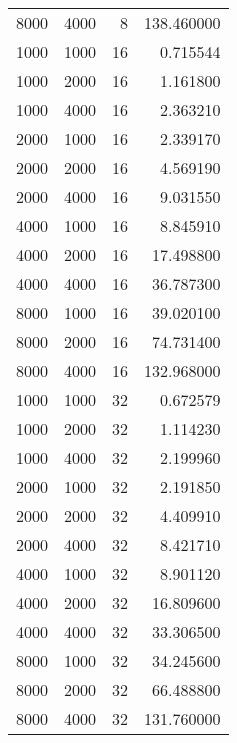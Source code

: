 \begin{tabular}{rrrr}
8000 & 4000 & 8 & 138.460000 \\
1000 & 1000 & 16 & 0.715544 \\
1000 & 2000 & 16 & 1.161800 \\
1000 & 4000 & 16 & 2.363210 \\
2000 & 1000 & 16 & 2.339170 \\
2000 & 2000 & 16 & 4.569190 \\
2000 & 4000 & 16 & 9.031550 \\
4000 & 1000 & 16 & 8.845910 \\
4000 & 2000 & 16 & 17.498800 \\
4000 & 4000 & 16 & 36.787300 \\
8000 & 1000 & 16 & 39.020100 \\
8000 & 2000 & 16 & 74.731400 \\
8000 & 4000 & 16 & 132.968000 \\
1000 & 1000 & 32 & 0.672579 \\
1000 & 2000 & 32 & 1.114230 \\
1000 & 4000 & 32 & 2.199960 \\
2000 & 1000 & 32 & 2.191850 \\
2000 & 2000 & 32 & 4.409910 \\
2000 & 4000 & 32 & 8.421710 \\
4000 & 1000 & 32 & 8.901120 \\
4000 & 2000 & 32 & 16.809600 \\
4000 & 4000 & 32 & 33.306500 \\
8000 & 1000 & 32 & 34.245600 \\
8000 & 2000 & 32 & 66.488800 \\
8000 & 4000 & 32 & 131.760000 \\
\bottomrule
\end{tabular}
